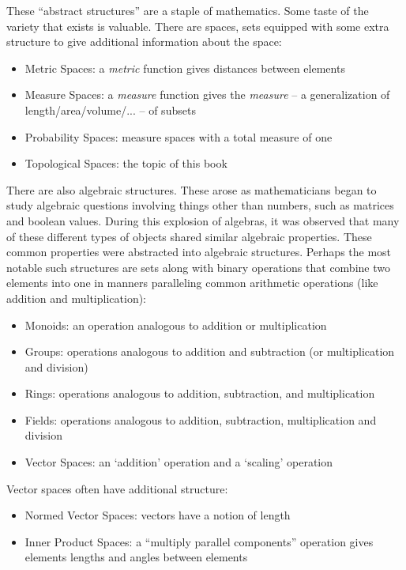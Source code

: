 \documentclass{report}
\begin{document}
These ``abstract structures'' are a staple of mathematics. Some taste of the variety that exists is valuable. There are spaces, sets equipped with some extra structure to give additional information about the space:

\begin{itemize}
\item Metric Spaces: a \emph{metric} function gives distances between elements
\item Measure Spaces: a \emph{measure} function gives the \emph{measure} -- a generalization of length/area/volume/... -- of subsets
\item Probability Spaces: measure spaces with a total measure of one
\item Topological Spaces: the topic of this book
\end{itemize}

There are also algebraic structures. These arose as mathematicians began to study algebraic questions involving things other than numbers, such as matrices and boolean values. During this explosion of algebras, it was observed that many of these different types of objects shared similar algebraic properties. These common properties were abstracted into algebraic structures. Perhaps the most notable such structures are sets along with binary operations that combine two elements into one in manners paralleling common arithmetic operations (like addition and multiplication):

\begin{itemize}
\item Monoids: an operation analogous to addition or multiplication
\item Groups: operations analogous to addition and subtraction (or multiplication and division)
\item Rings: operations analogous to addition, subtraction, and multiplication
\item Fields: operations analogous to addition, subtraction, multiplication and division
\item Vector Spaces: an `addition' operation and a `scaling' operation
\end{itemize}

Vector spaces often have additional structure:

\begin{itemize}
\item Normed Vector Spaces: vectors have a notion of length
\item Inner Product Spaces: a ``multiply parallel components'' operation gives elements lengths and angles between elements
\end{itemize}
\end{document}
